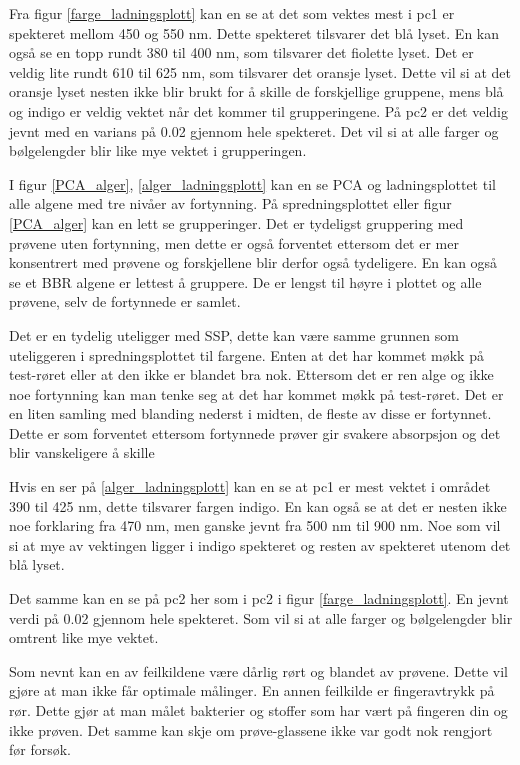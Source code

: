 \documentclass[twocolumn, 11pt]{article} %
\begin{document}
Fra figur \ref{farge_ladningsplott} kan en se at det som vektes mest i pc1 er spekteret mellom 450 og 550 nm. Dette spekteret tilsvarer det blå lyset. En kan også se en topp rundt 380 til 400 nm, som tilsvarer det fiolette lyset. Det er veldig lite rundt 610 til 625 nm, som tilsvarer det oransje lyset. Dette vil si at det oransje lyset nesten ikke blir brukt for å skille de forskjellige gruppene, mens blå og indigo er veldig vektet når det kommer til grupperingene. På pc2 er det veldig jevnt med en varians på 0.02 gjennom hele spekteret. Det vil si at alle farger og bølgelengder blir like mye vektet i grupperingen.


I figur \ref{PCA_alger}, \ref{alger_ladningsplott} kan en se PCA og ladningsplottet til alle algene med tre nivåer av fortynning. På spredningsplottet eller figur \ref{PCA_alger} kan en lett se grupperinger. Det er tydeligst gruppering med prøvene uten fortynning, men dette er også forventet ettersom det er mer konsentrert med prøvene og forskjellene blir derfor også tydeligere. En kan også se et BBR algene er lettest å gruppere. De er lengst til høyre i plottet og alle prøvene, selv de fortynnede er samlet. 

Det er en tydelig uteligger med SSP, dette kan være samme grunnen som uteliggeren i spredningsplottet til fargene. Enten at det har kommet møkk på test-røret eller at den ikke er blandet bra nok. Ettersom det er ren alge og ikke noe fortynning kan man tenke seg at det har kommet møkk på test-røret. 
Det er en liten samling med blanding nederst i midten, de fleste av disse er fortynnet. Dette er som forventet ettersom fortynnede prøver gir svakere absorpsjon og det blir vanskeligere å skille

Hvis en ser på \ref{alger_ladningsplott} kan en se at pc1 er mest vektet i området 390 til 425 nm, dette tilsvarer fargen indigo. 
En kan også se at det er nesten ikke noe forklaring fra 470 nm, men ganske jevnt fra 500 nm til 900 nm. Noe som vil si at mye av vektingen ligger i indigo spekteret og resten av spekteret utenom det blå lyset.

Det samme kan en se på pc2 her som i pc2 i figur \ref{farge_ladningsplott}. En jevnt verdi på 0.02 gjennom hele spekteret. Som vil si at alle farger og bølgelengder blir omtrent like mye vektet.


\bigskip 

Som nevnt kan en av feilkildene være dårlig rørt og blandet av prøvene. Dette vil gjøre at man ikke får optimale målinger.
En annen feilkilde er fingeravtrykk på rør. Dette gjør at man målet bakterier og stoffer som har vært på fingeren din og ikke prøven. Det samme kan skje om prøve-glassene ikke var godt nok rengjort før forsøk.
\end{document}
